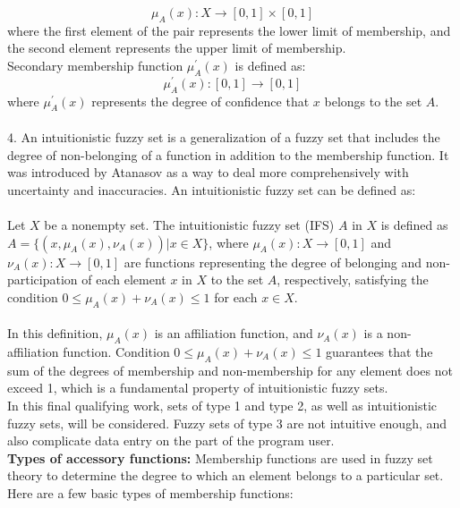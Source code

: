 \documentclass{article}
\begin{document}
    \hspace{0.5cm}
    \begin{minipage}{0.49\textwidth}
            \[\mu_{A}(x) : X \rightarrow [0,1] \times [0,1]\]
            where the first element of the pair represents the lower limit of membership, and the second element represents the upper limit of membership.\\
            Secondary membership function \(\mu_{A}^{'}(x)\) is defined as:\\
            \[\mu_{A}^{'}(x) : [0,1] \rightarrow [0,1]\]
            where \(\mu_{A}^{'}(x)\) represents the degree of confidence that \(x\) belongs to the set \(A\).\\
        ~\\
        4. An intuitionistic fuzzy set is a generalization of a fuzzy set that includes the degree of non-belonging of a function in addition to the membership function. It was introduced by Atanasov as a way to deal more comprehensively with uncertainty and inaccuracies. An intuitionistic fuzzy set can be defined as:\\
            ~\\
            Let $X$ be a nonempty set. The intuitionistic fuzzy set (IFS) $A$ in $X$ is defined as $A = \{(x,\mu_A(x), \nu_A(x)) | x \in X\}$, where $\mu_A(x): X\rightarrow [0,1]$ and $\nu_A(x): X\rightarrow [0,1]$ are functions representing the degree of belonging and non-participation of each element $x$ in $X$ to the set $A$, respectively, satisfying the condition $0\leq\mu_A(x) + \nu_A(x) \leq 1$ for each $x\in X$.\\
            ~\\
            In this definition, $\mu_A(x)$ is an affiliation function, and $\nu_A(x)$ is a non-affiliation function. Condition $0 \leq \mu_A(x) + \nu_A(x)\leq 1$ guarantees that the sum of the degrees of membership and non-membership for any element does not exceed 1, which is a fundamental property of intuitionistic fuzzy sets.\\
        In this final qualifying work, sets of type 1 and type 2, as well as intuitionistic fuzzy sets, will be considered. Fuzzy sets of type 3 are not intuitive enough, and also complicate data entry on the part of the program user.\\
        \textbf{Types of accessory functions:}
        Membership functions are used in fuzzy set theory to determine the degree to which an element belongs to a particular set. Here are a few basic types of membership functions:
        \begin{enumerate}

\end{enumerate}
\end{minipage}
\end{document}
